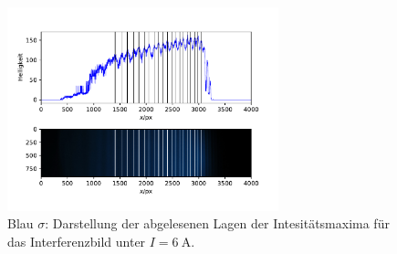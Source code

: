 \begin{figure}
  \centering
  \includegraphics[width = 0.7\textwidth]{../Messdaten/plots/peaks_blau_sigma_6.pdf}
  \caption{Blau $\sigma$: Darstellung der abgelesenen Lagen der Intesitätsmaxima für das Interferenzbild unter $I =\SI{6}{\ampere}$.}
  \label{fig: peaks_blau_sigma_6}
\end{figure}

